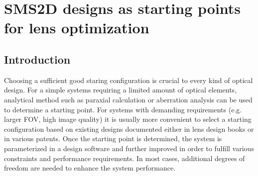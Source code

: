 \chapter{SMS2D designs as starting points for lens optimization} %
\label{chapter_5} %
\graphicspath{ {./chapter-5/figures/} }  %
\captionsetup[figure]{labelfont=bf}
\captionsetup{margin=1.5em}
\captionsetup[table]{labelfont=bf}






\noindent 


\section{Introduction}
Choosing a sufficient good staring configuration is crucial to every kind of optical design. For a simple systems requiring a limited amount of optical elements, analytical method such as paraxial calculation or aberration analysis can be used to determine a starting point. For systems with demanding requirements (e.g. larger FOV, high image quality) it is usually more convenient to select a starting configuration based on existing designs documented either in lens design books \cite{book:Kingslake}\cite{book:SmithModernOpticalEngineering}\cite{book:FisherOpticalSysDesign} or in various patents. Once the starting point is determined, the system is parameterized in a design software and further improved in order to fulfill various constraints and performance requirements. In most cases, additional degrees of freedom are needed to enhance the system performance. 

